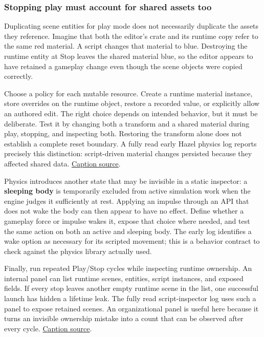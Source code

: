 \subsubsection{Stopping play must account for shared assets too}\label{06-engine-ii-ch032-stopping-play-must-account-for-shared-assets-too}

\hypertarget{06-engine-ii-ch032-stopping-play-must-account-for-shared-assets-too}{}

Duplicating scene entities for play mode does not necessarily duplicate the assets they reference. Imagine that both the editor's crate and its runtime copy refer to the same red material. A script changes that material to blue. Destroying the runtime entity at Stop leaves the shared material blue, so the editor appears to have retained a gameplay change even though the scene objects were copied correctly.

Choose a policy for each mutable resource. Create a runtime material instance, store overrides on the runtime object, restore a recorded value, or explicitly allow an authored edit. The right choice depends on intended behavior, but it must be deliberate. Test it by changing both a transform and a shared material during play, stopping, and inspecting both. Restoring the transform alone does not establish a complete reset boundary. A fully read early Hazel physics log reports precisely this distinction: script-driven material changes persisted because they affected shared data. \href{https://www.youtube.com/watch?v=RlQ4YVnQN40}{Caption source}.

Physics introduces another state that may be invisible in a static inspector: a \textbf{sleeping body} is temporarily excluded from active simulation work when the engine judges it sufficiently at rest. Applying an impulse through an API that does not wake the body can then appear to have no effect. Define whether a gameplay force or impulse wakes it, expose that choice where needed, and test the same action on both an active and sleeping body. The early log identifies a wake option as necessary for its scripted movement; this is a behavior contract to check against the physics library actually used.

Finally, run repeated Play/Stop cycles while inspecting runtime ownership. An internal panel can list runtime scenes, entities, script instances, and exposed fields. If every stop leaves another empty runtime scene in the list, one successful launch has hidden a lifetime leak. The fully read script-inspector log uses such a panel to expose retained scenes. An organizational panel is useful here because it turns an invisible ownership mistake into a count that can be observed after every cycle. \href{https://www.youtube.com/watch?v=g9HGp3icrIg}{Caption source}.

